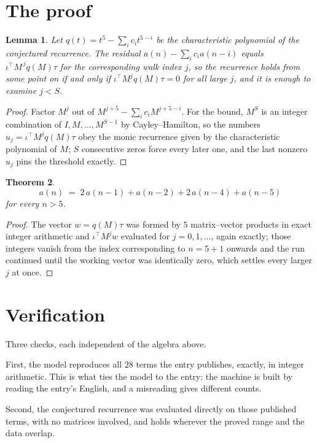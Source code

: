 \documentclass[11pt,a4paper]{article}
\theoremstyle{plain}
\newtheorem{theorem}{Theorem}
\newtheorem{lemma}[theorem]{Lemma}
\theoremstyle{definition}
\begin{document}
\section{The proof}

\begin{lemma}\label{lem:crit}
Let $q(t)=t^{5}-\sum_i c_it^{5-i}$ be the characteristic polynomial of the
conjectured recurrence. The residual $a(n)-\sum_ic_ia(n-i)$ equals
$\iota^{\!\top}M^{\,j}q(M)\tau$ for the corresponding walk index $j$, so the recurrence
holds from some point on if and only if $\iota^{\!\top}M^{j}q(M)\tau=0$ for all large $j$,
and it is enough to examine $j<S$.
\end{lemma}

\begin{proof}
Factor $M^{j}$ out of $M^{j+5}-\sum_ic_iM^{j+5-i}$. For the bound, $M^{S}$
is an integer combination of $I,M,\dots,M^{S-1}$ by Cayley--Hamilton, so the numbers
$u_j=\iota^{\!\top}M^{j}q(M)\tau$ obey the monic recurrence given by the characteristic
polynomial of $M$; $S$ consecutive zeros force every later one, and the last nonzero $u_j$
pins the threshold exactly.
\end{proof}

\begin{theorem}
\[
a(n)\;=\;2\,a(n-1) + a(n-2) + 2\,a(n-4) + a(n-5)
\]
for every $n>5$.
\end{theorem}

\begin{proof}
The vector $w=q(M)\tau$ was formed by $5$ matrix--vector products in exact integer
arithmetic and $\iota^{\!\top}M^{j}w$ evaluated for $j=0,1,\dots$, again exactly; those
integers vanish from the index corresponding to $n=5+1$ onwards and the run continued
until the working vector was identically zero, which settles every larger $j$ at once.
\end{proof}

\section{Verification}

Three checks, each independent of the algebra above.

First, the model reproduces all $28$ terms the entry publishes, exactly, in integer
arithmetic. This is what ties the model to the entry: the machine is built by reading the
entry's English, and a misreading gives different counts.

Second, the conjectured recurrence was evaluated directly on those published terms, with no
matrices involved, and holds wherever the proved range and the data overlap.
\end{document}
